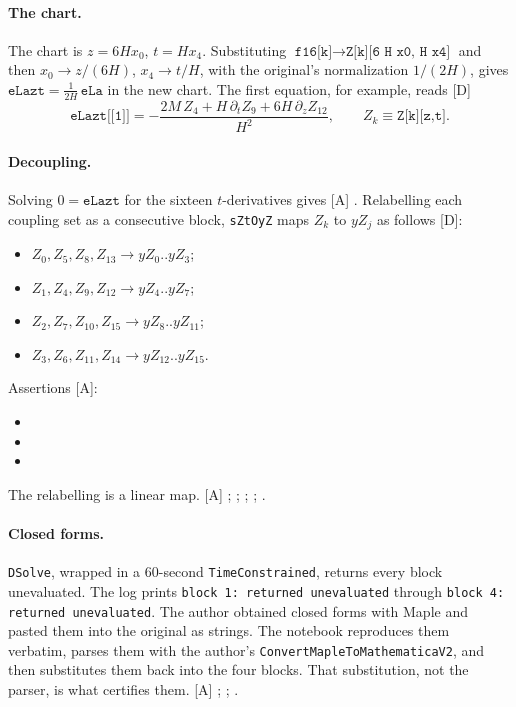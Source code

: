 \paragraph{The chart.} The chart is $z=6Hx_0$, $t=Hx_4$. Substituting
$\texttt{f16[k]}\to\texttt{Z[k][6 H x0, H x4]}$ and then $x_0\to z/(6H)$, $x_4\to t/H$, with
the original's normalization $1/(2H)$, gives $\texttt{eLazt}=\tfrac{1}{2H}\,\texttt{eLa}$ in the
new chart. The first equation, for example, reads [D]
\begin{equation}
  \texttt{eLazt[[1]]} = -\frac{2M\,Z_4 + H\,\partial_t Z_9 + 6H\,\partial_z Z_{12}}{H^2},
  \qquad Z_k\equiv\texttt{Z[k][z,t]}.
\end{equation}

\paragraph{Decoupling.} Solving $0=\texttt{eLazt}$ for the sixteen $t$-derivatives gives [A]
. Relabelling each coupling set as a
consecutive block, \texttt{sZtOyZ} maps $Z_k$ to $yZ_j$ as follows [D]:
\begin{itemize}
  \item $Z_0,Z_5,Z_8,Z_{13}\to yZ_0..yZ_3$;
  \item $Z_1,Z_4,Z_9,Z_{12}\to yZ_4..yZ_7$;
  \item $Z_2,Z_7,Z_{10},Z_{15}\to yZ_8..yZ_{11}$;
  \item $Z_3,Z_6,Z_{11},Z_{14}\to yZ_{12}..yZ_{15}$.
\end{itemize}
Assertions [A]:
\begin{itemize}
  \item {}
  \item {}
  \item {}
\end{itemize}
The relabelling is a linear map. [A] ;
; ;
;
.

\paragraph{Closed forms.} \texttt{DSolve}, wrapped in a 60-second \texttt{TimeConstrained},
returns every block unevaluated. The log prints \texttt{block 1: returned unevaluated} through
\texttt{block 4: returned unevaluated}. The author obtained closed forms with Maple and pasted
them into the original as strings. The notebook reproduces them verbatim, parses them with the
author's \texttt{ConvertMapleToMathematicaV2}, and then substitutes them back into the four
blocks. That substitution, not the parser, is what certifies them. [A]
; ;
.

